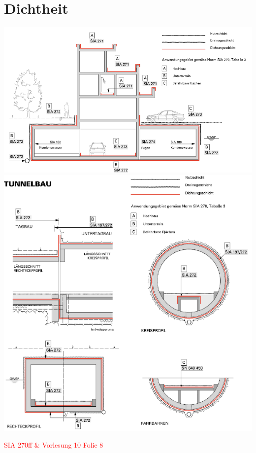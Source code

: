 \section{Dichtheit}

	\begin{minipage}{\linewidth}
		
			\includegraphics[width=0.5\linewidth]{images/Dichtheit1HochbauAbdichtung.PNG}
			\includegraphics[width=0.5\linewidth]{images/Dichtheit2TunnelAbdichtung.PNG}
	

	\end{minipage}

\textcolor{red}{SIA 270ff \& Vorlesung 10 Folie 8}